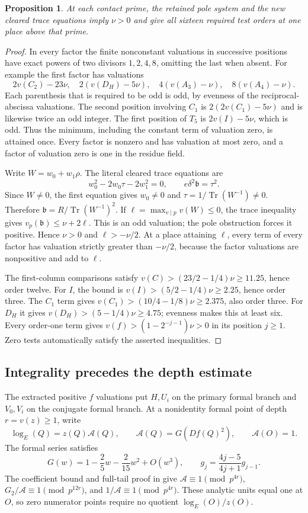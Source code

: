 \documentclass[11pt,a4paper]{article}
\newtheorem{proposition}[theorem]{Proposition}
\DeclareMathOperator{\Tr}{Tr}\DeclareMathOperator{\Nm}{Nm}
\begin{document}
\begin{proposition}\label{prop:extract}
At each contact prime, the retained pole system and the new cleared
trace equations imply $\nu>0$ and give all sixteen required test
orders at one place above that prime.
\end{proposition}
\begin{proof}
In every factor the finite nonconstant valuations in successive
positions have exact powers of two divisors $1,2,4,8$, omitting the
last when absent. For example the first factor has valuations
\[
 2v(C_2)-23\nu,\quad 2(v(D_H)-5\nu),\quad
 4(v(A_3)-\nu),\quad 8(v(A_4)-\nu).
\]
Each parenthesis that is required to be odd is odd, by evenness of
the reciprocal-abscissa valuations. The second position involving
$C_1$ is $2(2v(C_1)-5\nu)$ and is likewise twice an odd integer.
The first position of $T_5$ is $2v(I)-5\nu$, which is odd.
Thus the minimum, including the constant term of valuation zero,
is attained once. Every factor is nonzero and has valuation at most
zero, and a factor of valuation zero is one in the residue field.

Write $W=w_0+w_1\rho$. The literal cleared trace equations are
\[
 w_0^2-2w_0\tau-2w_1^2=0,\qquad e\delta^2\mathfrak b=\tau^2.
\]
Since $W\ne0$, the first equation gives $w_0\ne0$ and
$\tau=1/\Tr(W^{-1})\ne0$. Therefore
$\mathfrak b=R/\Tr(W^{-1})^2$. If
$\ell=\max_{v\mid p}v(W)\le0$, the trace inequality gives
$v_p(\mathfrak b)\le\nu+2\ell$.
This is an odd valuation; the pole obstruction forces it positive.
Hence $\nu>0$ and $\ell>-\nu/2$.
At a place attaining $\ell$, every term of every factor has valuation
strictly greater than $-\nu/2$, because the factor valuations are
nonpositive and add to $\ell$.

The first-column comparisons satisfy
$v(C)>(23/2-1/4)\nu\ge11.25$, hence order twelve.
For $I$, the bound is $v(I)>(5/2-1/4)\nu\ge2.25$, hence order three.
The $C_1$ term gives $v(C_1)>(10/4-1/8)\nu\ge2.375$, also order
three. For $D_H$ it gives $v(D_H)>(5-1/4)\nu\ge4.75$;
evenness makes this at least six. Every order-one term gives
$v(f)>(1-2^{-j-1})\nu>0$ in its position $j\ge1$.
Zero tests automatically satisfy the asserted inequalities.
\end{proof}

\subsection{Integrality precedes the depth estimate}
The extracted positive $f$ valuations put $H,U_i$ on the primary
formal branch and $V_0,V_i$ on the conjugate formal branch.
At a nonidentity formal point of depth $r=v(z)\ge1$, write
\[
 \log_E(Q)=z(Q)\mathcal A(Q),\qquad
 \mathcal A(Q)=G(Df(Q)^2),\qquad \mathcal A(O)=1.
\]
The formal series satisfies
\[
 G(w)=1-\frac25w-\frac2{15}w^2+O(w^3),\qquad
 g_j=\frac{4j-5}{4j+1}g_{j-1}.
\]
The coefficient bound and full-tail proof in \cite[Lemma 3.1]{Even}
give $\mathcal A\equiv1\pmod{p^{4r}}$,
$G_2/\mathcal A\equiv1\pmod{p^{12r}}$, and
$1/\mathcal A\equiv1\pmod{p^{4r}}$.
These analytic units equal one at $O$, so zero numerator points
require no quotient $\log_E(O)/z(O)$.
\end{document}
